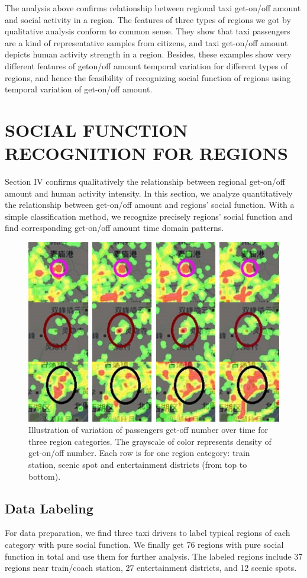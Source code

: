 \documentclass[a4paper, 10pt, conference]{ieeeconf}      %
\begin{document}
The analysis above confirms relationship between regional taxi get-on/off amount and social activity in a region. The features of three types of regions we got by qualitative analysis conform to common sense. They show that taxi passengers are a kind of representative samples from citizens, and taxi get-on/off amount depicts human activity strength in a region. Besides, these examples show very different features of geton/off amount temporal variation for different types of regions, and hence the feasibility of recognizing social function of regions using temporal variation of get-on/off amount.
\section{SOCIAL FUNCTION RECOGNITION FOR REGIONS}%
Section IV confirms qualitatively the relationship between regional get-on/off amount and human activity intensity. In this section, we analyze quantitatively the relationship between get-on/off amount and regions’ social function. With a simple classification method, we recognize precisely regions’ social function and find corresponding get-on/off amount time domain patterns.

\begin{figure}[htpb]
    \centering
    \includegraphics{fig/f2.png}
    \caption{Illustration of variation of passengers get-off number over time for three region categories. The grayscale of color represents density of get-on/off number. Each row is for one region category: train station, scenic spot and entertainment districts (from top to bottom).}
    \label{fig:my_label_2}
\end{figure}

\subsection{Data Labeling} For data preparation, we find three taxi drivers to label typical regions of each category with pure social function. We finally get 76 regions with pure social function in total and use them for further analysis. The labeled regions include 37 regions near train/coach station, 27 entertainment districts, and 12 scenic spots.
\end{document}
